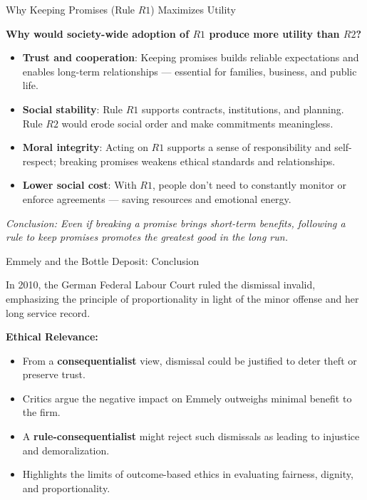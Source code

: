 \documentclass[aspectratio=169, 10pt]{beamer}
\begin{document}
\begin{frame}{Why Keeping Promises (Rule \( R1 \)) Maximizes Utility}

\textbf{Why would society-wide adoption of \( R1 \) produce more utility than \( R2 \)?}

\begin{itemize}
    \item \textbf{Trust and cooperation}: Keeping promises builds reliable expectations and enables long-term relationships — essential for families, business, and public life.
    
    \item \textbf{Social stability}: Rule \( R1 \) supports contracts, institutions, and planning. Rule \( R2 \) would erode social order and make commitments meaningless.

    \item \textbf{Moral integrity}: Acting on \( R1 \) supports a sense of responsibility and self-respect; breaking promises weakens ethical standards and relationships.

    \item \textbf{Lower social cost}: With \( R1 \), people don't need to constantly monitor or enforce agreements — saving resources and emotional energy.
\end{itemize}

\vspace{0.5em}
\textit{Conclusion: Even if breaking a promise brings short-term benefits, following a rule to keep promises promotes the greatest good in the long run.}

\end{frame}


\begin{frame}{Emmely and the Bottle Deposit: Conclusion}

\begin{tcolorbox}[colback=WHUblue!5!white, colframe=WHUblue, title=Legal Outcome, fonttitle=\bfseries, sharp corners=south]
    In 2010, the German Federal Labour Court ruled the dismissal invalid, emphasizing the principle of proportionality in light of the minor offense and her long service record.
\end{tcolorbox}

\vspace{0.5em}
\textbf{Ethical Relevance:} \\
\begin{itemize}
  \item    From a \textbf{consequentialist} view, dismissal could be justified to deter theft or preserve trust.
  \item  Critics argue the negative impact on Emmely outweighs minimal benefit to the firm.
  \item  A \textbf{rule-consequentialist} might reject such dismissals as leading to injustice and demoralization.
  \item  Highlights the limits of outcome-based ethics in evaluating fairness, dignity, and proportionality.
\end{itemize}

\end{frame}
\end{document}
